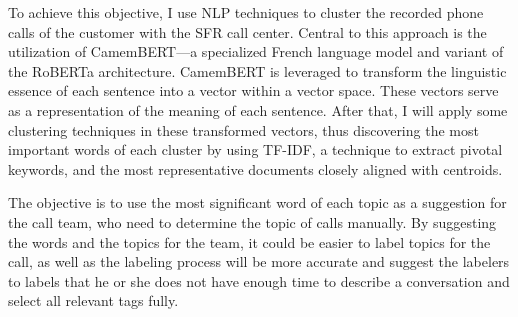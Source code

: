 To achieve this objective, I use NLP techniques to cluster the recorded phone calls of the customer with the SFR call center. Central to this approach is the utilization of CamemBERT\cite{martin2020camembert}—a specialized French language model and variant of the RoBERTa\cite{liu2019roberta} architecture. CamemBERT is leveraged to transform the linguistic essence of each sentence into a vector within a vector space. These vectors serve as a representation of the meaning of each sentence. After that, I will apply some clustering techniques in these transformed vectors, thus discovering the most important words of each cluster by using TF-IDF, a technique to extract pivotal keywords, and the most representative documents closely aligned with centroids.

The objective is to use the most significant word of each topic as a suggestion for the call team, who need to determine the topic of calls manually. By suggesting the words and the topics for the team, it could be easier to label topics for the call, as well as the labeling process will be more accurate and suggest the labelers to labels that he or she does not have enough time to describe a conversation and select all relevant tags fully.